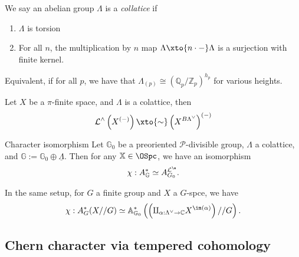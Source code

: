 \begin{definition} We say an abelian group $\Lambda$ is a \textit{collatice} if
\begin{enumerate}
    \item $\Lambda$ is torsion
    \item For all $n$, the multiplication by $n$ map $\Lambda \xto{n\cdot-} \Lambda$ is a surjection with finite kernel.
\end{enumerate}
\end{definition}

Equivalent, if for all $p$, we have that $\Lambda_{(p)} \cong \left( \mathbb{Q}_p / \mathbb{Z}_p \right)^{h_p}$ for various heights.

\begin{proposition} Let $X$ be a $\pi$-finite space, and $\Lambda$ is a colattice, then
\begin{align*}
   \mathcal{L}^\wedge \left( X^{(-)} \right) \xto{\sim} \left( X^{B\Lambda^\vee} \right)^{(-)}
\end{align*}
\end{proposition}

\begin{customenvironment}{Character isomorphism} Let $\mathbb{G}_0$ be a preoriented $\mathcal{P}$-divisible group, $\Lambda$ a colattice, and $\mathbb{G} := \mathbb{G}_0 \oplus \underline{\Lambda}$. Then for any $\mathbb{X} \in \OSpc$, we have an isomorphism
\begin{align*}
    \chi : A^\ast_{\mathbb{G}} \simeq A_{G_0}^{\mathcal{L}^\e}.
\end{align*}
\end{customenvironment}

\begin{corollary} In the same setup, for $G$ a finite group and $X$ a $G$-spce, we have
\begin{align*}
    \chi : A_G^\ast(X // G) \simeq \mathbb{A}_{\mathbb{G}_0}^\ast \left( \left( \amalg_{\alpha : \Lambda^\vee \to \mathbb{C}} X^{\im(\alpha)} \right)  // G\right).
\end{align*}
\end{corollary}

\subsection{Chern character via tempered cohomology}


